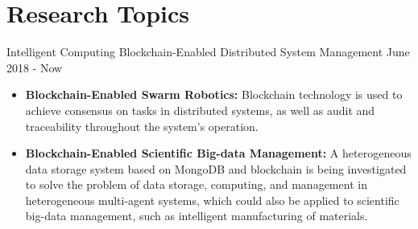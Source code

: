 \ifswedish
\else
    \section{Research Topics}
        \position
            {Intelligent Computing}
            {Blockchain-Enabled Distributed System Management}
            {June 2018 - Now}
            {
            	\begin{itemize}
            	\item \textbf{Blockchain-Enabled Swarm Robotics:} Blockchain technology is used to achieve consensus on tasks in distributed systems, as well as audit and traceability throughout the system's operation. 
            	\item \textbf{Blockchain-Enabled Scientific Big-data Management:} A heterogeneous data storage system based on MongoDB and blockchain is being investigated to solve the problem of data storage, computing, and management in heterogeneous multi-agent systems, which could also be applied to scientific big-data management, such as intelligent manufacturing of materials.
            	\end{itemize}
            }
 
